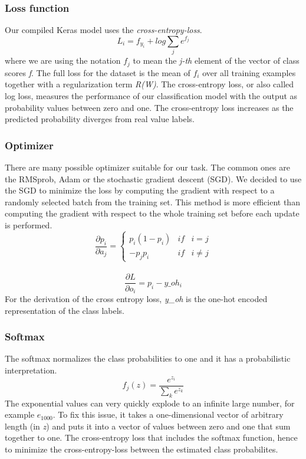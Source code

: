 \documentclass[journal]{IEEEtran}
\begin{document}
\subsubsection{Loss function}
\noindent Our compiled Keras model uses the \textit{cross-entropy-loss}. 
\begin{equation}
L_{i} = f_{y_{i}} + log \sum_{j} e^{f_{j}}
\end{equation}
where we are using the notation \(f_{j}\) to mean the \textit{j-th} element of the vector of class scores \textit{f}. The full loss for the dataset is the mean of \(f_{i}\) over all training examples together with a regularization term \textit{R(W)}.
The cross-entropy loss, or also called log loss, measures the performance of our classification model with the output as probability values between zero and one. The cross-entropy loss increases as the predicted probability diverges from real value labels.
\subsubsection{Optimizer}
\noindent There are many possible optimizer suitable for our task. The common ones are the RMSprob, Adam or the stochastic gradient descent (SGD). We decided to use the SGD
to minimize the loss by computing the gradient with respect to a randomly selected batch from the training set. This method is more efficient than computing the gradient with respect to the whole training set before each update is performed.
\begin{equation}
\frac{\partial p_i}{\partial a_j}=\left\{\begin{matrix} p_i(1-p_i) & if & i=j\\ -p_j p_i & if & i\neq j \end{matrix}\right.
\end{equation} \\
\begin{equation}
\frac{\partial L}{\partial o_i}=p_i-y\_oh_i
\end{equation} 
For the derivation of the cross entropy loss, \textit{y\_oh} is the one-hot encoded representation of the class labels.
\subsubsection{Softmax}
\noindent The softmax normalizes the class probabilities to one and it has a probabilistic interpretation. 
\begin{equation}
f_{j}(z) = \frac{e^{z_{i}}}{\sum_{k} e^{z_{k}}}
\end{equation}
The exponential values can very quickly explode to an infinite large number, for example \(e_{1000}\). To fix this issue, it takes a one-dimensional vector of arbitrary length (in \textit{z}) and puts it into a vector of values between zero and one that sum together to one. The cross-entropy loss that includes the softmax function, hence to minimize the cross-entropy-loss between the estimated class probabilites. \\
\end{document}
